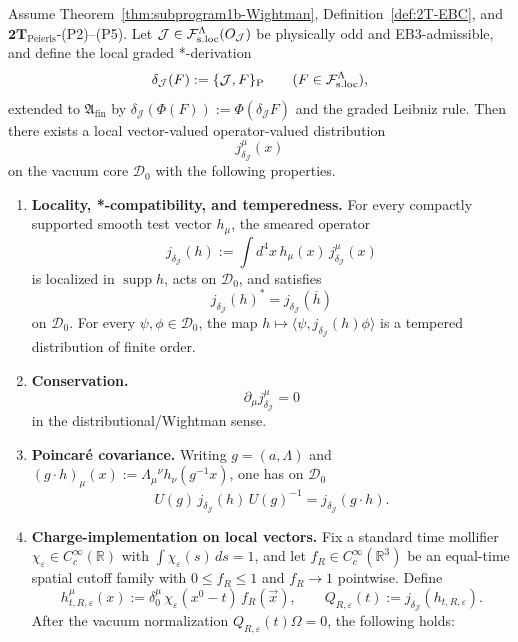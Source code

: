 \begin{lemma}
\label{lem:peierls-noether-current-datum}
Assume Theorem~\ref{thm:subprogram1b-Wightman},
Definition~\ref{def:2T-EBC},
and \(\mathbf{2T}_{\mathrm{Peierls}}\)\textnormal{-(P2)--(P5)}.
Let \(\mathcal J\in\mathcal F_{\mathrm{s.loc}}^\Lambda(O_{\mathcal J})\) be physically odd and EB3-admissible, and
define the local graded *-derivation
\[
\delta_{\mathcal J}(F):=\{\mathcal J,F\}_{\mathrm P}
\qquad(F\in\mathcal F_{\mathrm{s.loc}}^\Lambda),
\]
extended to \(\mathfrak A_{\mathrm{fin}}\) by
\(\delta_{\mathcal J}(\Phi(F)):=\Phi(\delta_{\mathcal J}F)\) and the graded Leibniz rule.
Then there exists a local vector-valued operator-valued distribution
\[
j^\mu_{\delta_{\mathcal J}}(x)
\]
on the vacuum core \(\mathcal D_0\) with the following properties.
\begin{enumerate}[label=\textnormal{(\roman*)},leftmargin=*,itemsep=0.35em]
\item \textbf{Locality, *-compatibility, and temperedness.}
  For every compactly supported smooth test vector \(h_\mu\), the smeared operator
  \[
  j_{\delta_{\mathcal J}}(h):=\int d^4x\,h_\mu(x)\,j^\mu_{\delta_{\mathcal J}}(x)
  \]
  is localized in \(\operatorname{supp} h\), acts on \(\mathcal D_0\), and satisfies
  \[
  j_{\delta_{\mathcal J}}(h)^*=j_{\delta_{\mathcal J}}(\overline h)
  \]
  on \(\mathcal D_0\).
  For every \(\psi,\phi\in\mathcal D_0\), the map
  \(h\mapsto \langle \psi,j_{\delta_{\mathcal J}}(h)\phi\rangle\)
  is a tempered distribution of finite order.
\item \textbf{Conservation.}
  \[
  \partial_\mu j^\mu_{\delta_{\mathcal J}}=0
  \]
  in the distributional/Wightman sense.
\item \textbf{Poincar\'e covariance.}
  Writing \(g=(a,\Lambda)\) and
  \((g\cdot h)_\mu(x):=\Lambda_\mu{}^\nu h_\nu(g^{-1}x)\),
  one has on \(\mathcal D_0\)
  \[
  U(g)\,j_{\delta_{\mathcal J}}(h)\,U(g)^{-1}
  =
  j_{\delta_{\mathcal J}}(g\cdot h).
  \]
\item \textbf{Charge-implementation on local vectors.}
  Fix a standard time mollifier \(\chi_\varepsilon\in C_c^\infty(\mathbb R)\) with
  \(\int \chi_\varepsilon(s)\,ds=1\), and let \(f_R\in C_c^\infty(\mathbb R^3)\) be an
  equal-time spatial cutoff family with \(0\le f_R\le 1\) and \(f_R\to 1\) pointwise.
  Define
  \[
  h^\mu_{t,R,\varepsilon}(x):=\delta^\mu_0\,\chi_\varepsilon(x^0-t)\,f_R(\vec x),
  \qquad
  Q_{R,\varepsilon}(t):=j_{\delta_{\mathcal J}}(h_{t,R,\varepsilon}).
  \]
  After the vacuum normalization \(Q_{R,\varepsilon}(t)\Omega=0\), the following holds:

\end{enumerate}
\end{lemma}
